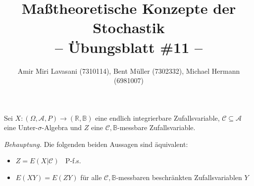 \documentclass[10pt]{article}
\newcommand{\beh}{\textit{Behauptung. }}
\newenvironment{Aufgabe}[2][Aufgabe]{\begin{trivlist}
\item[\hskip \labelsep {\bfseries #1}\hskip \labelsep {\bfseries #2.}]}{\end{trivlist}}
\begin{document}
 
\title{ \textbf{Maßtheoretische Konzepte der Stochastik \\ -- Übungsblatt \#11 --} }

\author{Amir Miri Lavasani (7310114), Bent Müller (7302332),
        Michael Hermann (6981007)}
\maketitle

\begin{Aufgabe}{1} %
	Sei $X:(\Omega, \mathcal{A}, P) \rightarrow (\mathbb{R}, \mathbb{B})$ eine endlich integrierbare Zufallsvariable, 
	$\mathcal{C} \subseteq \mathcal{A}$ eine Unter-$\sigma$-Algebra und $Z$ eine $\mathcal{C},\mathbb{B}$-messbare Zufallsvariable.
\end{Aufgabe}

\beh Die folgenden beiden Aussagen sind äquivalent:
\begin{itemize}
	\item[(i)] $Z = E(X|\mathcal{C}) \;\;$ P-f.s.
	\item[(ii)] $E(XY) = E(ZY)$ für alle  $\mathcal{C},\mathbb{B}$-messbaren beschränkten Zufallsvariablen $Y$
\end{itemize}
\end{document}
